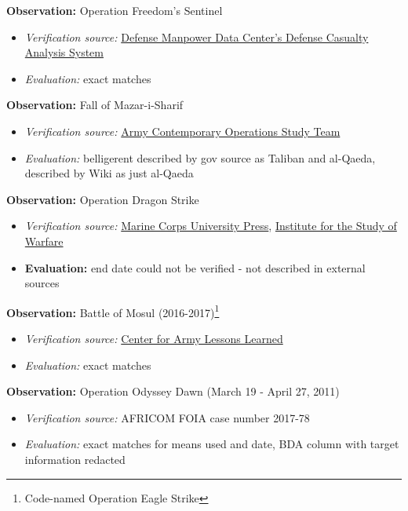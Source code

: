 \documentclass[fleqn,12pt]{article}
\begin{document}
\vspace{-.3cm}
\noindent
\textbf{Observation:} Operation Freedom's Sentinel
\begin{itemize}
    \item \textit{Verification source:} \href{https://dcas.dmdc.osd.mil/dcas/app/conflictCasualties/ofs}{Defense Manpower Data Center's Defense Casualty Analysis System}
    \item \textit{Evaluation:} exact matches
\end{itemize}

\vspace{-.3cm}
\noindent
\textbf{Observation:} Fall of Mazar-i-Sharif
\begin{itemize}
    \item \textit{Verification source:} \href{https://history.army.mil/html/bookshelves/resmat/GWOT/DifferentKindofWar.pdf}{Army Contemporary Operations Study Team}
    \item \textit{Evaluation:} belligerent described by gov source as Taliban and al-Qaeda, described by Wiki as just al-Qaeda
\end{itemize}

\vspace{-.3cm}
\noindent
\textbf{Observation:} Operation Dragon Strike
\begin{itemize}
    \item \textit{Verification source:} \href{https://www.marines.mil/Portals/1/Publications/War,\%20Will,\%20and\%20Warlords.pdf}{Marine Corps University Press}, \href{https://www.understandingwar.org/sites/default/files/Afghanistan\%20Report\%207_15Dec.pdf}{Institute for the Study of Warfare}
    \item \textbf{Evaluation:} end date could not be verified - not described in external sources
\end{itemize}

\vspace{-.3cm}
\noindent
\textbf{Observation:} Battle of Mosul (2016-2017)\footnote{Code-named Operation Eagle Strike}
\begin{itemize}
    \item \textit{Verification source:} \href{https://usacac.army.mil/sites/default/files/publications/CALL\%20Insider\%20MAR-APR17.pdf}{Center for Army Lessons Learned}
    \item \textit{Evaluation:} exact matches
\end{itemize}

\vspace{-.3cm}
\noindent
\textbf{Observation:} Operation Odyssey Dawn (March 19 - April 27, 2011)
\begin{itemize}
    \item \textit{Verification source:} AFRICOM FOIA case number 2017-78
    \item \textit{Evaluation:} exact matches for means used and date, BDA column with target information redacted
\end{itemize}
\end{document}
